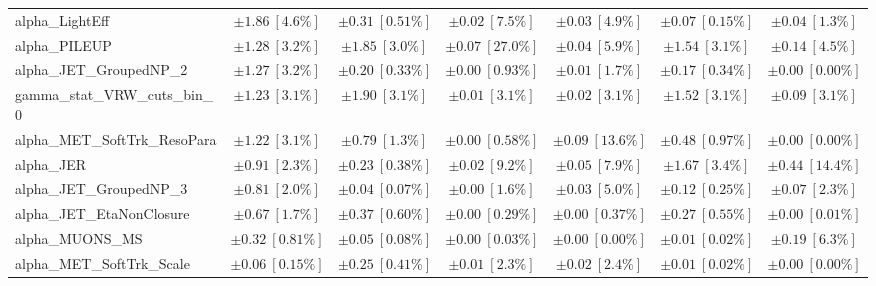 \begin{sidewaystable}
\begin{center}
\begin{tabular*}{\textwidth}{@{\extracolsep{\fill}}lcccccc}
alpha\_LightEff         & $\pm 1.86\ [4.6\%] $          & $\pm 0.31\ [0.51\%] $          & $\pm 0.02\ [7.5\%] $          & $\pm 0.03\ [4.9\%] $          & $\pm 0.07\ [0.15\%] $          & $\pm 0.04\ [1.3\%] $       \\
alpha\_PILEUP         & $\pm 1.28\ [3.2\%] $          & $\pm 1.85\ [3.0\%] $          & $\pm 0.07\ [27.0\%] $          & $\pm 0.04\ [5.9\%] $          & $\pm 1.54\ [3.1\%] $          & $\pm 0.14\ [4.5\%] $       \\
alpha\_JET\_GroupedNP\_2         & $\pm 1.27\ [3.2\%] $          & $\pm 0.20\ [0.33\%] $          & $\pm 0.00\ [0.93\%] $          & $\pm 0.01\ [1.7\%] $          & $\pm 0.17\ [0.34\%] $          & $\pm 0.00\ [0.00\%] $       \\
gamma\_stat\_VRW\_cuts\_bin\_0         & $\pm 1.23\ [3.1\%] $          & $\pm 1.90\ [3.1\%] $          & $\pm 0.01\ [3.1\%] $          & $\pm 0.02\ [3.1\%] $          & $\pm 1.52\ [3.1\%] $          & $\pm 0.09\ [3.1\%] $       \\
alpha\_MET\_SoftTrk\_ResoPara         & $\pm 1.22\ [3.1\%] $          & $\pm 0.79\ [1.3\%] $          & $\pm 0.00\ [0.58\%] $          & $\pm 0.09\ [13.6\%] $          & $\pm 0.48\ [0.97\%] $          & $\pm 0.00\ [0.00\%] $       \\
alpha\_JER         & $\pm 0.91\ [2.3\%] $          & $\pm 0.23\ [0.38\%] $          & $\pm 0.02\ [9.2\%] $          & $\pm 0.05\ [7.9\%] $          & $\pm 1.67\ [3.4\%] $          & $\pm 0.44\ [14.4\%] $       \\
alpha\_JET\_GroupedNP\_3         & $\pm 0.81\ [2.0\%] $          & $\pm 0.04\ [0.07\%] $          & $\pm 0.00\ [1.6\%] $          & $\pm 0.03\ [5.0\%] $          & $\pm 0.12\ [0.25\%] $          & $\pm 0.07\ [2.3\%] $       \\
alpha\_JET\_EtaNonClosure         & $\pm 0.67\ [1.7\%] $          & $\pm 0.37\ [0.60\%] $          & $\pm 0.00\ [0.29\%] $          & $\pm 0.00\ [0.37\%] $          & $\pm 0.27\ [0.55\%] $          & $\pm 0.00\ [0.01\%] $       \\
alpha\_MUONS\_MS         & $\pm 0.32\ [0.81\%] $          & $\pm 0.05\ [0.08\%] $          & $\pm 0.00\ [0.03\%] $          & $\pm 0.00\ [0.00\%] $          & $\pm 0.01\ [0.02\%] $          & $\pm 0.19\ [6.3\%] $       \\
alpha\_MET\_SoftTrk\_Scale         & $\pm 0.06\ [0.15\%] $          & $\pm 0.25\ [0.41\%] $          & $\pm 0.01\ [2.3\%] $          & $\pm 0.02\ [2.4\%] $          & $\pm 0.01\ [0.02\%] $          & $\pm 0.00\ [0.00\%] $       \\

\end{tabular*}
\end{center}
\end{sidewaystable}
